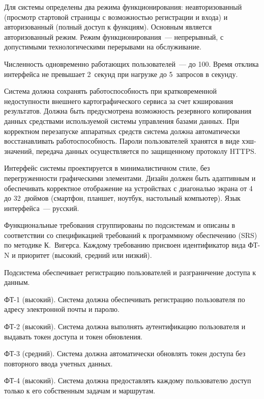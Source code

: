 Для системы определены два режима функционирования: неавторизованный (просмотр
стартовой страницы с возможностью регистрации и входа) и авторизованный (полный доступ
к функциям). Основным является авторизованный режим. Режим функционирования~---
непрерывный, с допустимыми технологическими перерывами на обслуживание.

Численность одновременно работающих пользователей~--- до 100. Время отклика интерфейса
не превышает 2~секунд при нагрузке до 5~запросов в секунду.

Система должна сохранять работоспособность при кратковременной недоступности внешнего
картографического сервиса за счет кэширования результатов. Должна быть предусмотрена
возможность резервного копирования данных средствами используемой системы управления
базами данных. При корректном перезапуске аппаратных средств система должна
автоматически восстанавливать работоспособность. Пароли пользователей хранятся в виде
хэш-значений, передача данных осуществляется по защищенному протоколу HTTPS.

Интерфейс системы проектируется в минималистичном стиле, без перегруженности
графическими элементами. Дизайн должен быть адаптивным и обеспечивать корректное
отображение на устройствах с диагональю экрана от 4 до 32~дюймов (смартфон, планшет,
ноутбук, настольный компьютер). Язык интерфейса~--- русский.

Функциональные требования сгруппированы по подсистемам и описаны в соответствии со
спецификацией требований к программному обеспечению (SRS) по методике К.~Вигерса.
Каждому требованию присвоен идентификатор вида ФТ-N и приоритет (высокий, средний или
низкий).

Подсистема обеспечивает регистрацию пользователей и разграничение доступа к данным.
\begin{compactlistdot}
  \item ФТ-1 (высокий). Система должна обеспечивать регистрацию пользователя по адресу электронной почты и паролю.
  \item ФТ-2 (высокий). Система должна выполнять аутентификацию пользователя и выдавать токен доступа и токен обновления.
  \item ФТ-3 (средний). Система должна автоматически обновлять токен доступа без повторного ввода учетных данных.
  \item ФТ-4 (высокий). Система должна предоставлять каждому пользователю доступ только к его собственным задачам и маршрутам.
\end{compactlistdot}

